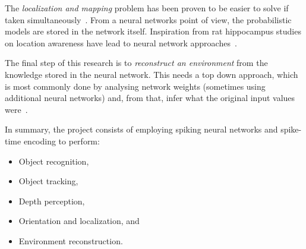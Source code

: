 The \emph{localization and mapping} problem has been proven to be easier to solve if taken simultaneously~\cite{Durrant-Whyte2006-slam,Fuentes-Pacheco2012-slam}. From a neural networks point of view, the probabilistic models are stored in the network itself. Inspiration from rat hippocampus studies on location awareness have lead to neural network approaches~\cite{Milford2004-ratslam}.

The final step of this research is to \emph{reconstruct an environment} from the knowledge stored in the neural network. This needs a top down approach, which is most commonly done by analysing network weights (sometimes using additional neural networks) and, from that, infer what the original input values were~\cite{Anh-Dung-deconv-nets}. 


In summary, the project consists of employing spiking neural networks and spike-time encoding to perform:
\begin{itemize}
  \item Object recognition,
  \item Object tracking,
  \item Depth perception,
  \item Orientation and localization, and
  \item Environment reconstruction.
\end{itemize}